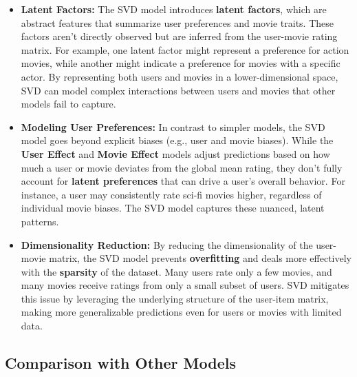\documentclass[
]{article}
\begin{document}
\begin{itemize}
\item
  \textbf{Latent Factors:} The SVD model introduces \textbf{latent
  factors}, which are abstract features that summarize user preferences
  and movie traits. These factors aren't directly observed but are
  inferred from the user-movie rating matrix. For example, one latent
  factor might represent a preference for action movies, while another
  might indicate a preference for movies with a specific actor. By
  representing both users and movies in a lower-dimensional space, SVD
  can model complex interactions between users and movies that other
  models fail to capture.
\item
  \textbf{Modeling User Preferences:} In contrast to simpler models, the
  SVD model goes beyond explicit biases (e.g., user and movie biases).
  While the \textbf{User Effect} and \textbf{Movie Effect} models adjust
  predictions based on how much a user or movie deviates from the global
  mean rating, they don't fully account for \textbf{latent preferences}
  that can drive a user's overall behavior. For instance, a user may
  consistently rate sci-fi movies higher, regardless of individual movie
  biases. The SVD model captures these nuanced, latent patterns.
\item
  \textbf{Dimensionality Reduction:} By reducing the dimensionality of
  the user-movie matrix, the SVD model prevents \textbf{overfitting} and
  deals more effectively with the \textbf{sparsity} of the dataset. Many
  users rate only a few movies, and many movies receive ratings from
  only a small subset of users. SVD mitigates this issue by leveraging
  the underlying structure of the user-item matrix, making more
  generalizable predictions even for users or movies with limited data.
\end{itemize}

\subsection{Comparison with Other
Models}\label{comparison-with-other-models}
\end{document}
